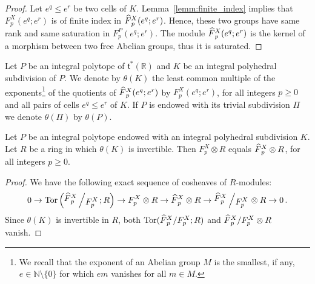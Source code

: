 \documentclass[AHL,Unicode,longabstracts,published]{cedram}
\newcommand{\bigslant}[2]{{\raisebox{.2em}{$#1$}\left/\raisebox{-.2em}{$#2$}\right.}}
\newcommand{\R}{\mathbb{R}}
\newcommand{\N}{\mathbb{N}}
\renewcommand{\t}{\mathfrak{t}}
\DeclareMathOperator{\Tor}{Tor}
\newcommand{\Fbar}{\hat{F}}
\newcommand{\smallslant}[2]{{#1}/{#2}}
\let\oldhat\hat
\renewcommand*{\hat}[1]{\mathchoice{\widehat{#1}}{\widehat{#1}}{\oldhat{#1}}{\oldhat{#1}}}
\begin{document}
\begin{proof}
Let $e^q\leq e^r$ be two cells of $K$. Lemma~\ref{lemm:finite_index} implies that $F_p^X(e^q;e^r)$ is of finite index in $\Fbar_p^X(e^q;e^r)$. Hence, these two groups have same rank and same saturation in $F^P_p(e^q;e^r)$. The module $\Fbar_p^X(e^q;e^r)$ is the kernel of a morphism between two free Abelian groups, thus it is saturated.
\end{proof}

\begin{defi}\label{definition:theta}
Let $P$ be an integral polytope of $\t^*(\R)$ and $K$ be an integral polyhedral subdivision of $P$. We denote by $\theta(K)$ the least common multiple of the exponents\footnote{We recall that the exponent of an Abelian group $M$ is the smallest, if any, $e\in\N\setminus\{0\}$ for which $em$ vanishes for all $m\in M$.} of the quotients of $\Fbar^X_p(e^q;e^r)$ by $F^X_p(e^q;e^r)$, for all integers $p\geq 0$ and all pairs of cells $e^q\leq e^r$ of $K$. If $P$ is endowed with its trivial subdivision $\Pi$ we denote $\theta(\Pi)$ by $\theta(P)$.
\end{defi}



\begin{prop}
Let $P$ be an integral polytope endowed with an integral polyhedral subdivision $K$. Let $R$ be a ring in which $\theta(K)$ is invertible. Then $F_p^X\otimes R$ equals $\Fbar_p^X\otimes R$, for all integers $p\geq 0$.
\end{prop}

\begin{proof}
We have the following exact sequence of cosheaves of $R$-modules:
\begin{equation*}
0 \rightarrow \Tor\left(\bigslant{\Fbar^X_p}{F^X_p}; R\right) \rightarrow F_p^X\otimes R \rightarrow \Fbar^X_p\otimes R \rightarrow \bigslant{\Fbar^X_p}{F^X_p}\otimes R \rightarrow 0\,.
\end{equation*}
Since $\theta(K)$ is invertible in $R$, both $\Tor(\smallslant{\Fbar^X_p}{F^X_p}; R)$ and $\smallslant{\Fbar^X_p}{F^X_p}\otimes R$ vanish.
\end{proof}
\end{document}
